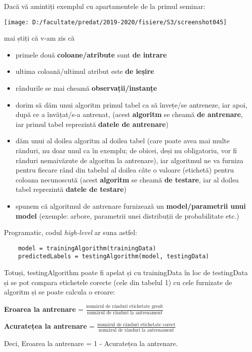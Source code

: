 \documentclass[12pt]{article}
\begin{document}
	Dacă vă amintiți exemplul cu apartamentele de la primul seminar:
	\begin{center}
		\texttt{[image: D:/facultate/predat/2019-2020/fisiere/S3/screenshot045]}
	\end{center}
	mai știți că v-am zis că 
	\begin{itemize}
		\item primele două \textbf{coloane/atribute} sunt \textbf{de intrare}
		\item ultima coloană/ultimul atribut este \textbf{de ieșire}
		\item rândurile se mai cheamă \textbf{observații/instanțe}
		\item dorim să dăm unui algoritm primul tabel ca să învețe/se antreneze, iar apoi, după ce a învățat/s-a antrenat, (acest \textbf{algoritm} se cheamă \textbf{de antrenare}, iar primul tabel reprezintă \textbf{datele de antrenare})
		\item dăm unui al doilea algoritm al doilea tabel (care poate avea mai multe rănduri, nu doar unul ca în exemplu; de obicei, deși nu obligatoriu, vor fi rânduri nemaivăzute de algoritm la antrenare), iar algoritmul ne va furniza pentru fiecare rând din tabelul al doilea câte o valoare (etichetă) pentru coloana necunoscută (acest \textbf{algoritm} se cheamă \textbf{de testare}, iar al doilea tabel reprezintă \textbf{datele de testare})
		\item spunem că algoritmul de antrenare furnizează un \textbf{model/parametrii unui model} (exemple: arbore, parametrii unei distribuții de probabilitate etc.)
	\end{itemize}  
	Programatic, codul \textit{high-level} ar suna astfel:
	\begin{verbatim}
	model = trainingAlgorithm(trainingData)
	predictedLabels = testingAlgorithm(model, testingData)
	\end{verbatim}
	
	Totuși, testingAlgorithm poate fi apelat și cu trainingData în loc de testingData și se pot compara etichetele corecte (cele din tabelul 1) cu cele furnizate de algoritm și se poate calcula o eroare:
	
	\textbf{Eroarea la antrenare} = $\frac{\text{numărul de rânduri etichetate greșit}}{\text{numărul de rânduri la antrenament}}$
	
	\textbf{Acuratețea la antrenare} = $\frac{\text{numărul de rânduri etichetate corect}}{\text{numărul de rânduri la antrenament}}$
	
	Deci, Eroarea la antrenare = 1 - Acuratețea la antrenare.
	
\end{document}
